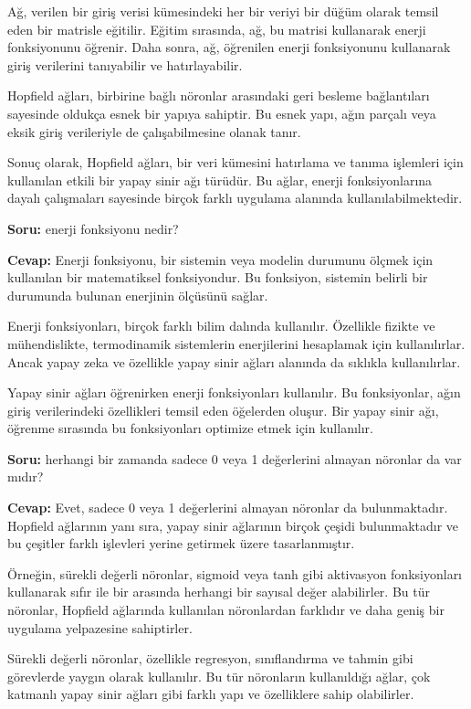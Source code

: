 \documentclass[11pt]{article}
\begin{document}
Ağ, verilen bir giriş verisi kümesindeki her bir veriyi bir düğüm olarak temsil eden bir matrisle eğitilir. Eğitim sırasında, ağ, bu matrisi kullanarak enerji fonksiyonunu öğrenir. Daha sonra, ağ, öğrenilen enerji fonksiyonunu kullanarak giriş verilerini tanıyabilir ve hatırlayabilir.

Hopfield ağları, birbirine bağlı nöronlar arasındaki geri besleme bağlantıları sayesinde oldukça esnek bir yapıya sahiptir. Bu esnek yapı, ağın parçalı veya eksik giriş verileriyle de çalışabilmesine olanak tanır.

Sonuç olarak, Hopfield ağları, bir veri kümesini hatırlama ve tanıma işlemleri için kullanılan etkili bir yapay sinir ağı türüdür. Bu ağlar, enerji fonksiyonlarına dayalı çalışmaları sayesinde birçok farklı uygulama alanında kullanılabilmektedir.


\textbf{Soru:} enerji fonksiyonu nedir?

\textbf{Cevap:} Enerji fonksiyonu, bir sistemin veya modelin durumunu ölçmek için kullanılan bir matematiksel fonksiyondur. Bu fonksiyon, sistemin belirli bir durumunda bulunan enerjinin ölçüsünü sağlar.

Enerji fonksiyonları, birçok farklı bilim dalında kullanılır. Özellikle fizikte ve mühendislikte, termodinamik sistemlerin enerjilerini hesaplamak için kullanılırlar. Ancak yapay zeka ve özellikle yapay sinir ağları alanında da sıklıkla kullanılırlar.

Yapay sinir ağları öğrenirken enerji fonksiyonları kullanılır. Bu fonksiyonlar, ağın giriş verilerindeki özellikleri temsil eden öğelerden oluşur. Bir yapay sinir ağı, öğrenme sırasında bu fonksiyonları optimize etmek için kullanılır.

\textbf{Soru:} herhangi bir zamanda sadece 0 veya 1 değerlerini almayan nöronlar da var mıdır?

\textbf{Cevap:} Evet, sadece 0 veya 1 değerlerini almayan nöronlar da bulunmaktadır. Hopfield ağlarının yanı sıra, yapay sinir ağlarının birçok çeşidi bulunmaktadır ve bu çeşitler farklı işlevleri yerine getirmek üzere tasarlanmıştır.


Örneğin, sürekli değerli nöronlar, sigmoid veya tanh gibi aktivasyon fonksiyonları kullanarak sıfır ile bir arasında herhangi bir sayısal değer alabilirler. Bu tür nöronlar, Hopfield ağlarında kullanılan nöronlardan farklıdır ve daha geniş bir uygulama yelpazesine sahiptirler.

Sürekli değerli nöronlar, özellikle regresyon, sınıflandırma ve tahmin gibi görevlerde yaygın olarak kullanılır. Bu tür nöronların kullanıldığı ağlar, çok katmanlı yapay sinir ağları gibi farklı yapı ve özelliklere sahip olabilirler.
\end{document}
